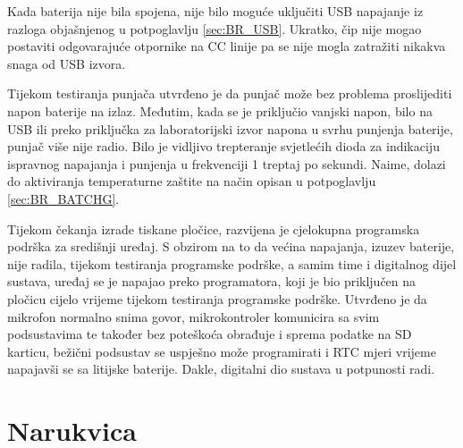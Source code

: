 Kada baterija nije bila spojena, nije bilo moguće uključiti USB napajanje iz razloga objašnjenog u potpoglavlju \ref{sec:BR_USB}. Ukratko, čip nije mogao postaviti odgovarajuće otpornike na CC linije pa se nije mogla zatražiti nikakva snaga od USB izvora.

Tijekom testiranja punjača utvrđeno je da punjač može bez problema proslijediti napon baterije na izlaz. Međutim, kada se je priključio vanjski napon, bilo na USB ili preko priključka za laboratorijski izvor napona u svrhu punjenja baterije, punjač više nije radio. Bilo je vidljivo trepteranje svjetlećih dioda za indikaciju ispravnog napajanja i punjenja u frekvenciji 1 treptaj po sekundi. Naime, dolazi do aktiviranja temperaturne zaštite na način opisan u potpoglavlju \ref{sec:BR_BATCHG}.

Tijekom čekanja izrade tiskane pločice, razvijena je cjelokupna programska podrška za središnji uređaj. S obzirom na to da većina napajanja, izuzev baterije, nije radila, tijekom testiranja programske podrške, a samim time i digitalnog dijel sustava, uređaj se je napajao preko programatora, koji je bio priključen na pločicu cijelo vrijeme tijekom testiranja programske podrške. Utvrđeno je da mikrofon normalno snima govor, mikrokontroler komunicira sa svim podsustavima te također bez poteškoća obrađuje i sprema podatke na SD karticu, bežični podsustav se uspješno može programirati i RTC mjeri vrijeme napajavši se sa litijske baterije. Dakle, digitalni dio sustava u potpunosti radi.

\section{Narukvica}

